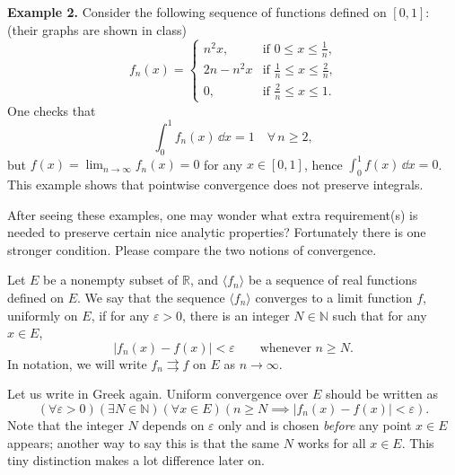 \documentclass[11pt]{article}
\begin{document}
\noindent\textbf{Example 2.} Consider the following sequence of functions defined on $[0,1]$: (their graphs are shown in class)
\[
  f_n(x) =
  \begin{cases}
    n^2 x, & \text{if $0 \leqslant x \leqslant \frac1n$,} \\
    2n - n^2 x & \text{if $\frac1n \leqslant x \leqslant \frac2n$,} \\
    0, & \text{if $\frac2n \leqslant x \leqslant 1$.}
  \end{cases}
\]
One checks that
\[
  \int_0^1 f_n(x) \, \dd x = 1 \quad \forall\, n \geqslant 2,
\]
but $\displaystyle f(x) =  \lim_{n \to \infty} f_n(x) = 0$ for any $x \in [0,1]$, hence $\int_0^1 f(x) \, \dd x = 0$.
This example shows that pointwise convergence does not preserve integrals.

\medskip

After seeing these examples, one may wonder what extra requirement(s) is needed to preserve certain nice analytic properties?
Fortunately there is one stronger condition.
Please compare the two notions of convergence.

\begin{defn}
  Let $E$ be a nonempty subset of $\mathbb{R}$, and $\langle f_n \rangle$ be a sequence of real functions defined on $E$.
  We say that the sequence $\langle f_n \rangle$ \textsf{converges} to a limit function $f$, \textsf{uniformly} on $E$, if for any $\varepsilon > 0$, there is an integer $N \in \mathbb{N}$ such that for any $x \in E$,
  \[
    |f_n(x) - f(x)| < \varepsilon \qquad \text{whenever $n \geqslant N$.}
  \]
  In notation, we will write $f_n \rightrightarrows f$ on $E$ as $n \to \infty$.
\end{defn}

Let us write in Greek again.
Uniform convergence over $E$ should be written as
\[
  (\forall \varepsilon > 0)(\exists N \in \mathbb{N})(\forall x \in E)(n \geqslant N \implies |f_n(x) - f(x)| < \varepsilon).
\]
Note that the integer $N$ depends on $\varepsilon$ only and is chosen \textit{before} any point $x \in E$ appears; another way to say this is that the same $N$ works for all $x \in E$.
This tiny distinction makes a lot difference later on.
\end{document}

